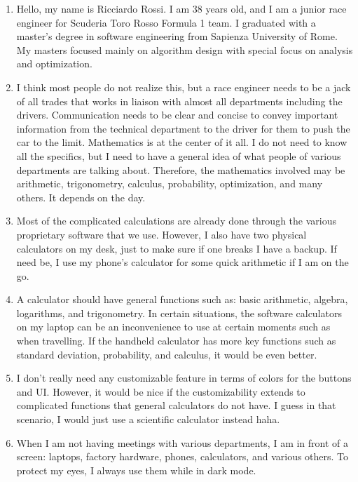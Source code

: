 \begin{itemize}
                    \begin{enumerate}
                        \item Hello, my name is Ricciardo Rossi. I am 38 years old, and I am a junior race engineer for Scuderia Toro Rosso Formula 1 team. I graduated with a master’s degree in software engineering from Sapienza University of Rome. My masters focused mainly on algorithm design with special focus on analysis and optimization.
                        \item I think most people do not realize this, but a race engineer needs to be a jack of all trades that works in liaison with almost all departments including the drivers. Communication needs to be clear and concise to convey important information from the technical department to the driver for them to push the car to the limit. Mathematics is at the center of it all. I do not need to know all the specifics, but I need to have a general idea of what people of various departments are talking about. Therefore, the mathematics involved may be arithmetic, trigonometry, calculus, probability, optimization, and many others. It depends on the day.
                        \item Most of the complicated calculations are already done through the various proprietary software that we use. However, I also have two physical calculators on my desk, just to make sure if one breaks I have a backup. If need be, I use my phone’s calculator for some quick arithmetic if I am on the go.
                        \item A calculator should have general functions such as: basic arithmetic, algebra, logarithms, and trigonometry. In certain situations, the software calculators on my laptop can be an inconvenience to use at certain moments such as when travelling. If the handheld calculator has more key functions such as standard deviation, probability, and calculus, it would be even better.
                        \item I don’t really need any customizable feature in terms of colors for the buttons and UI. However, it would be nice if the customizability extends to complicated functions that general calculators do not have. I guess in that scenario, I would just use a scientific calculator instead haha.
                        \item When I am not having meetings with various departments, I am in front of a screen:  laptops, factory hardware, phones, calculators, and various others. To protect my eyes, I always use them while in dark mode.

\end{enumerate}
\end{itemize}
